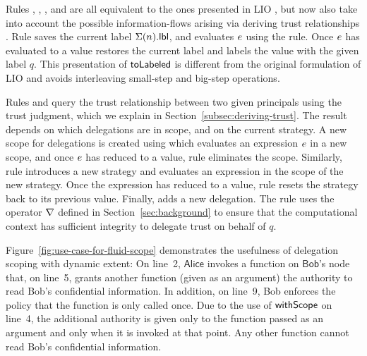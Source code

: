 Rules , , ,  and  are all equivalent to the ones presented in LIO \cite{SRMMlio}, but now also take into account the possible information-flows arising via deriving trust relationships \cite{Arden:2015:FA:2859845.2859998}. Rule  saves the current label $\Sigma(n).\mathsf{lbl}$, and evaluates $e$ using the  rule. Once $e$ has evaluated to a value  restores the current label and labels the value with the given label $q$. This presentation of $\mathsf{toLabeled}$ is different from the original formulation of LIO \cite{SRMMlio} and avoids interleaving small-step and big-step operations.


Rules  and  query the trust relationship between two given principals using the trust judgment, which we explain in Section~\ref{subsec:deriving-trust}. The result depends on which delegations are in scope, and on the current strategy. A new scope for delegations is created using  which evaluates an expression $e$ in a new scope, and once $e$ has reduced to a value, rule  eliminates the scope. Similarly, rule  introduces a new strategy and evaluates an expression in the scope of the new strategy. Once the expression has reduced to a value, rule  resets the strategy back to its previous value. Finally,  adds a new delegation. The rule uses the operator $\nabla$ defined in Section~\ref{sec:background} to ensure that the computational context has sufficient integrity to delegate trust on behalf of $q$.



Figure~\ref{fig:use-case-for-fluid-scope} demonstrates the usefulness of delegation scoping with dynamic extent: On line~2, $\mathsf{Alice}$ invokes a function on $\mathsf{Bob}$'s node that, on line~5, grants another function (given as an argument) the authority to read Bob's confidential information. In addition, on line~9, Bob enforces the policy that the function is only called once. Due to the use of $\mathsf{withScope}$ on line~4, the additional authority is given only to the function passed as an argument and only when it is invoked at that point. Any other function cannot read Bob's confidential information.

